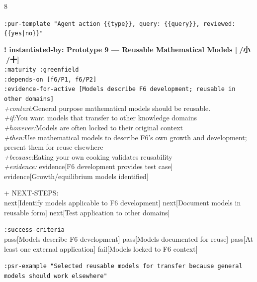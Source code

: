 \documentclass[landscape]{article}
\newcommand{\flexitag}[1]{\textcolor[gray]{0.35}{\textit{#1}}}
\newenvironment{devmapgreenfield}{%
  \def\FrameCommand{\colorbox{devmapgreenfieldbg}}%
  \setlength{\fboxsep}{2pt}%
  \MakeFramed{\advance\hsize-\width \FrameRestore}%
}{\endMakeFramed}
\begin{document}
\begin{paracol}{8}
\begin{devmapgreenfield}
  \texttt{:\allowbreak{}pur-\allowbreak{}template "Agent action \{\{type\}\},\allowbreak{} query:\allowbreak{} \{\{query\}\},\allowbreak{} reviewed:\allowbreak{} \{\{yes|\allowbreak{}no\}\}"}\\
\par
\par
\end{devmapgreenfield}
\begin{devmapgreenfield}
\textbf{! instantiated-by: Prototype 9 — Reusable Mathematical Models [🔸/小 🐊/十]}\\
  \texttt{:\allowbreak{}maturity :\allowbreak{}greenfield}\\
  \texttt{:\allowbreak{}depends-\allowbreak{}on [f6/\allowbreak{}P1,\allowbreak{} f6/\allowbreak{}P2]}\\
  \texttt{:\allowbreak{}evidence-\allowbreak{}for-\allowbreak{}active [Models describe F6 development;\allowbreak{} reusable in other domains]}\\
  \flexitag{+context:}General purpose mathematical models should be reusable.\\
  \flexitag{+if:}You want models that transfer to other knowledge domains\\
  \flexitag{+however:}Models are often locked to their original context\\
  \flexitag{+then:}Use mathematical models to describe F6’s own growth and development; present them for reuse elsewhere\\
  \flexitag{+because:}Eating your own cooking validates reusability\\
  \flexitag{+evidence:} evidence[F6 development provides test case] evidence[Growth/equilibrium models identified]\\
\par
  + NEXT-STEPS:\\
    next[Identify models applicable to F6 development] next[Document models in reusable form] next[Test application to other domains]\\
\par
  \texttt{:\allowbreak{}success-\allowbreak{}criteria}\\
    pass[Models describe F6 development] pass[Models documented for reuse] pass[At least one external application] fail[Models locked to F6 context]\\
\par
  \texttt{:\allowbreak{}psr-\allowbreak{}example "Selected reusable models for transfer because general models should work elsewhere"}\\

\end{devmapgreenfield}
\end{paracol}
\end{document}
